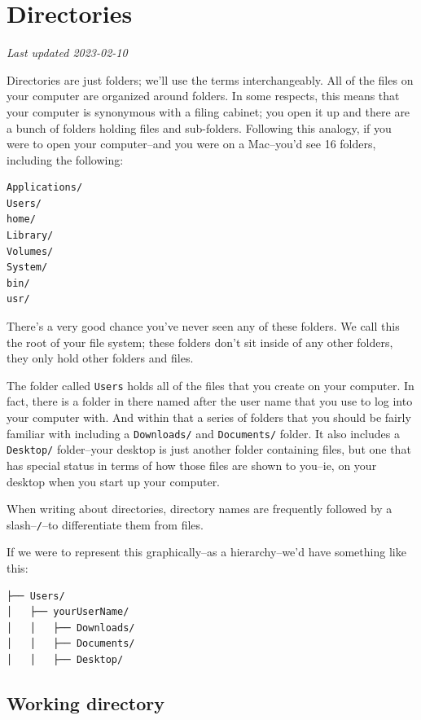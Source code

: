 \documentclass[
]{book}
\begin{document}
\hypertarget{directories}{%
\chapter{Directories}\label{directories}}

\emph{Last updated 2023-02-10}

Directories are just folders; we'll use the terms interchangeably. All of the files on your computer are organized around folders. In some respects, this means that your computer is synonymous with a filing cabinet; you open it up and there are a bunch of folders holding files and sub-folders. Following this analogy, if you were to open your computer--and you were on a Mac--you'd see 16 folders, including the following:

\begin{verbatim}
Applications/
Users/
home/
Library/
Volumes/
System/
bin/
usr/
\end{verbatim}

There's a very good chance you've never seen any of these folders. We call this the root of your file system; these folders don't sit inside of any other folders, they only hold other folders and files.

The folder called \texttt{Users} holds all of the files that you create on your computer. In fact, there is a folder in there named after the user name that you use to log into your computer with. And within that a series of folders that you should be fairly familiar with including a \texttt{Downloads/} and \texttt{Documents/} folder. It also includes a \texttt{Desktop/} folder--your desktop is just another folder containing files, but one that has special status in terms of how those files are shown to you--ie, on your desktop when you start up your computer.

When writing about directories, directory names are frequently followed by a slash--\texttt{/}--to differentiate them from files.

If we were to represent this graphically--as a hierarchy--we'd have something like this:

\begin{verbatim}
├── Users/
│   ├── yourUserName/
│   │   ├── Downloads/
│   │   ├── Documents/
│   │   ├── Desktop/
\end{verbatim}

\hypertarget{working-directory}{%
\section{Working directory}\label{working-directory}}
\end{document}
